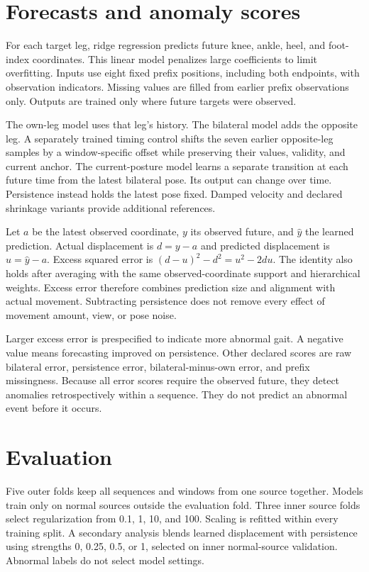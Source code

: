 \documentclass[letterpaper]{article}
\begin{document}
\section{Forecasts and anomaly scores}

For each target leg, ridge regression predicts future knee, ankle, heel, and foot-index coordinates. This linear model penalizes large coefficients to limit overfitting. Inputs use eight fixed prefix positions, including both endpoints, with observation indicators. Missing values are filled from earlier prefix observations only. Outputs are trained only where future targets were observed.

The own-leg model uses that leg's history. The bilateral model adds the opposite leg. A separately trained timing control shifts the seven earlier opposite-leg samples by a window-specific offset while preserving their values, validity, and current anchor. The current-posture model learns a separate transition at each future time from the latest bilateral pose. Its output can change over time. Persistence instead holds the latest pose fixed. Damped velocity and declared shrinkage variants provide additional references.

Let $a$ be the latest observed coordinate, $y$ its observed future, and $\widehat y$ the learned prediction. Actual displacement is $d = y - a$ and predicted displacement is $u = \widehat y - a$. Excess squared error is $(d - u)^2 - d^2 = u^2 - 2du$. The identity also holds after averaging with the same observed-coordinate support and hierarchical weights. Excess error therefore combines prediction size and alignment with actual movement. Subtracting persistence does not remove every effect of movement amount, view, or pose noise.

Larger excess error is prespecified to indicate more abnormal gait. A negative value means forecasting improved on persistence. Other declared scores are raw bilateral error, persistence error, bilateral-minus-own error, and prefix missingness. Because all error scores require the observed future, they detect anomalies retrospectively within a sequence. They do not predict an abnormal event before it occurs.

\section{Evaluation}

Five outer folds keep all sequences and windows from one source together. Models train only on normal sources outside the evaluation fold. Three inner source folds select regularization from 0.1, 1, 10, and 100. Scaling is refitted within every training split. A secondary analysis blends learned displacement with persistence using strengths 0, 0.25, 0.5, or 1, selected on inner normal-source validation. Abnormal labels do not select model settings.
\end{document}
